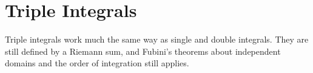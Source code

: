 \section{Triple Integrals}
\noindent
Triple integrals work much the same way as single and double integrals. They are still defined by a Riemann sum, and Fubini’s theorems about independent domains and the order of integration still applies.


